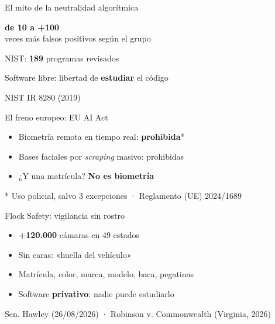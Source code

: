\documentclass[aspectratio=169,12pt]{beamer}
\def\navprev{}
\def\navnext{}
\newcommand{\nav}[2]{\gdef\navprev{#1}\gdef\navnext{#2}}
\newcommand{\cifra}[2]{%
  \begin{center}
    {\color{terra}\fontsize{36}{40}\selectfont\bfseries #1}\\[0.2cm]
    {\large #2}
  \end{center}}
\newcommand{\fuente}[1]{\vfill{\small\color{gris}#1\par}}
\begin{document}
\nav{Sesgos: Gender Shades}{EU AI Act}
\begin{frame}{El mito de la neutralidad algorítmica}
  \vspace{0.2cm}
  \cifra{de 10 a +100}{veces más falsos positivos según el grupo}
  \begin{center}
    {\large NIST: \textbf{189} programas revisados\par}
    \vspace{0.6cm}
    {\large Software libre: libertad de \alert{\textbf{estudiar}} el código\par}
  \end{center}
  \fuente{NIST IR 8280 (2019)}
\end{frame}

\nav{Sesgos: NIST}{Flock Safety}
\begin{frame}{El freno europeo: EU AI Act}
  \begin{itemize}
    \item Biometría remota en tiempo real: \alert{\textbf{prohibida}}*
    \item Bases faciales por \textit{scraping} masivo: prohibidas
    \item ¿Y una matrícula? \textbf{No es biometría}
  \end{itemize}
  \fuente{* Uso policial, salvo 3 excepciones · Reglamento (UE) 2024/1689}
\end{frame}

\nav{EU AI Act}{Seguir personas}
\begin{frame}{Flock Safety: vigilancia sin rostro}
  \begin{itemize}
    \item \textbf{+120.000} cámaras en 49 estados
    \item Sin caras: «huella del vehículo»
    \item Matrícula, color, marca, modelo, baca, pegatinas
    \item Software \alert{\textbf{privativo}}: nadie puede estudiarlo
  \end{itemize}
  \fuente{Sen. Hawley (26/08/2026) · Robinson v. Commonwealth (Virginia, 2026)}
\end{frame}
\end{document}
